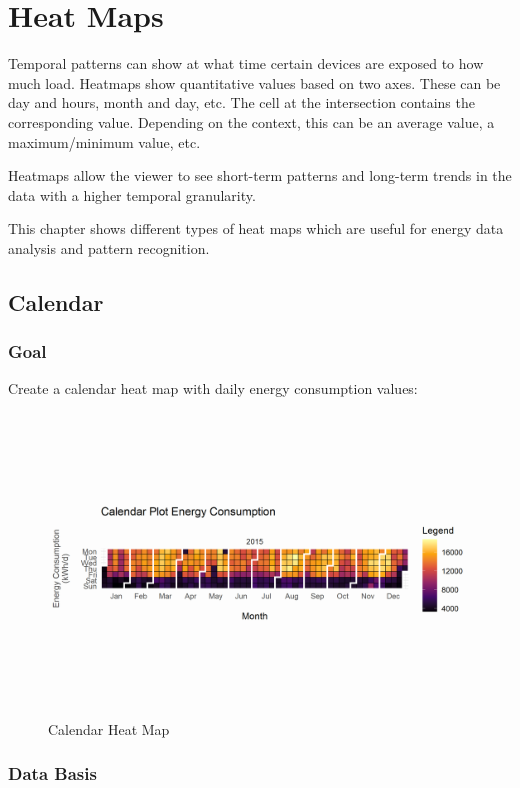 \documentclass[
  a4paperpaper,
]{book}
\begin{document}
\hypertarget{heat-maps}{%
\chapter{Heat Maps}\label{heat-maps}}

Temporal patterns can show at what time certain devices are exposed to how much load. Heatmaps show quantitative values based on two axes. These can be day and hours, month and day, etc. The cell at the intersection contains the corresponding value. Depending on the context, this can be an average value, a maximum/minimum value, etc.

Heatmaps allow the viewer to see short-term patterns and long-term trends in the data with a higher temporal granularity.

This chapter shows different types of heat maps which are useful for energy data analysis and pattern recognition.

\newpage

\hypertarget{calendar}{%
\section{Calendar}\label{calendar}}

\hypertarget{goal-10}{%
\subsection{Goal}\label{goal-10}}

Create a calendar heat map with daily energy consumption values:

\begin{figure}
\includegraphics[width=0.7\linewidth]{images/plotHeatMapCalendar} \caption{Calendar Heat Map}\label{fig:unnamed-chunk-20}
\end{figure}

\hypertarget{data-basis-10}{%
\subsection{Data Basis}\label{data-basis-10}}
\end{document}
